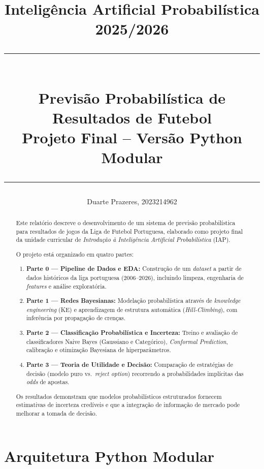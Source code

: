 \documentclass[12pt, a4paper]{article}
\title{
    \vspace{-1cm}

    {\large Inteligência Artificial Probabilística 2025/2026}\\[0.2cm]

    \rule{\linewidth}{0.5pt}\\[0.4cm]
    {\LARGE \textbf{Previsão Probabilística de Resultados de Futebol}}\\[0.3cm]
    {\large Projeto Final -- Versão Python Modular}\\[0.2cm]
    \rule{\linewidth}{0.5pt}
}
\author{
    Duarte Prazeres, 2023214962 \\
    \small
}
\begin{document}

\maketitle
\thispagestyle{empty}

\begin{abstract}
Este relatório descreve o desenvolvimento de um sistema de previsão probabilística para resultados de jogos da Liga de Futebol Portuguesa, elaborado como projeto final da unidade curricular de \emph{Introdução à Inteligência Artificial Probabilística} (IAP).

O projeto está organizado em quatro partes:

\begin{enumerate}[leftmargin=2em]
  \item \textbf{Parte 0 — Pipeline de Dados e EDA:} Construção de um \textit{dataset} a partir de dados históricos da liga portuguesa (2006--2026), incluindo limpeza, engenharia de \textit{features} e análise exploratória.
  \item \textbf{Parte 1 — Redes Bayesianas:} Modelação probabilística através de \textit{knowledge engineering} (KE) e aprendizagem de estrutura automática (\textit{Hill-Climbing}), com inferência por propagação de crenças.
  \item \textbf{Parte 2 — Classificação Probabilística e Incerteza:} Treino e avaliação de classificadores Naive Bayes (Gaussiano e Categórico), \textit{Conformal Prediction}, calibração e otimização Bayesiana de hiperparâmetros.
  \item \textbf{Parte 3 — Teoria de Utilidade e Decisão:} Comparação de estratégias de decisão (modelo puro vs.\ \textit{reject option}) recorrendo a probabilidades implícitas das \textit{odds} de apostas.
\end{enumerate}

Os resultados demonstram que modelos probabilísticos estruturados fornecem estimativas de incerteza credíveis e que a integração de informação de mercado pode melhorar a tomada de decisão.
\end{abstract}

\newpage
\tableofcontents
\newpage

\section{Arquitetura Python Modular}
\end{document}
